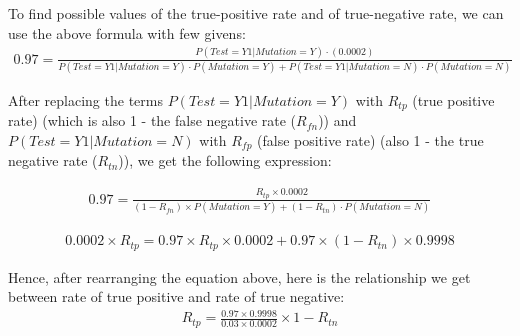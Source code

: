 
To find possible values of the true-positive rate and of true-negative rate, we can use the above formula with few givens:  
\begin{align*}
   0.97 =  \frac{P(Test = Y1|Mutation =Y)\cdot(0.0002)}{P(Test = Y1|Mutation =Y)\cdot P(Mutation = Y) + P(Test = Y1|Mutation =N)\cdot P(Mutation = N)}
\end{align*}

After replacing the terms $P(Test = Y1|Mutation =Y)$ with $R_{tp}$ (true positive rate) (which is also 1 - the false negative rate ($R_{fn}$)) and $P(Test = Y1|Mutation =N)$ with $R_{fp}$ (false positive rate) (also 1 - the true negative rate ($R_{tn}$)), we get the following expression:

\begin{align*}
   0.97 =  \frac{R_{tp}\times 0.0002}{(1-R_{fn})\times P(Mutation = Y) + (1 - R_{tn} )\cdot P(Mutation = N)}
\end{align*}

\begin{align*}
  0.0002 \times R_{tp} =  {0.97\times R_{tp}\times 0.0002} +{0.97\times (1-R_{tn})\times 0.9998}
\end{align*}

Hence, after rearranging the equation above, here is the relationship we get between rate of true positive and rate of true negative:
\begin{align*}
  R_{tp} = \frac{0.97\times0.9998}{0.03\times 0.0002}\times 1 - R_{tn}
\end{align*}
